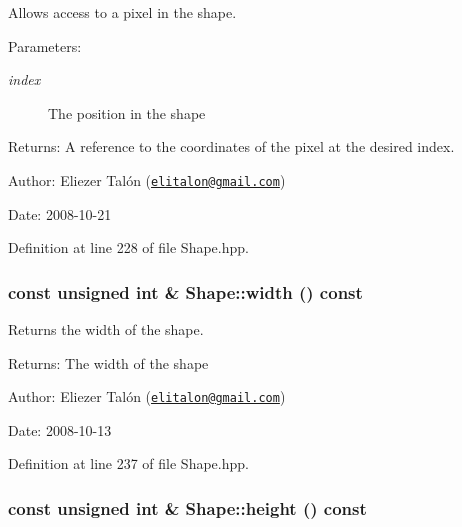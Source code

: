 Allows access to a pixel in the shape. 

\begin{Desc}
\item[Parameters:]
\begin{description}
\item[{\em index}]The position in the shape\end{description}
\end{Desc}
\begin{Desc}
\item[Returns:]A reference to the coordinates of the pixel at the desired index.\end{Desc}
\begin{Desc}
\item[Author:]Eliezer Talón (\href{mailto:elitalon@gmail.com}{\tt elitalon@gmail.com}) \end{Desc}
\begin{Desc}
\item[Date:]2008-10-21 \end{Desc}


Definition at line 228 of file Shape.hpp.\hypertarget{class_shape_6773dfedb96ef750e5469e22d51ecf0f}{
\subsubsection[width]{\setlength{\rightskip}{0pt plus 5cm}const unsigned int \& Shape::width () const}}
\label{class_shape_6773dfedb96ef750e5469e22d51ecf0f}


Returns the width of the shape. 

\begin{Desc}
\item[Returns:]The width of the shape\end{Desc}
\begin{Desc}
\item[Author:]Eliezer Talón (\href{mailto:elitalon@gmail.com}{\tt elitalon@gmail.com}) \end{Desc}
\begin{Desc}
\item[Date:]2008-10-13 \end{Desc}


Definition at line 237 of file Shape.hpp.\hypertarget{class_shape_8400155046b2190bce621f8f366ef2be}{
\subsubsection[height]{\setlength{\rightskip}{0pt plus 5cm}const unsigned int \& Shape::height () const}}
\label{class_shape_8400155046b2190bce621f8f366ef2be}


